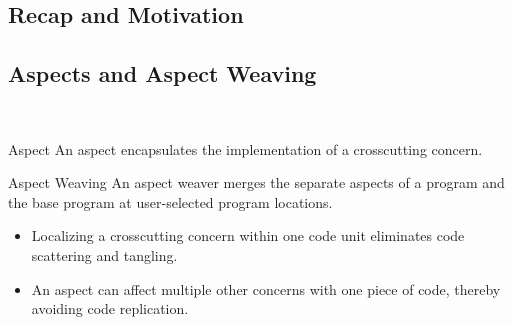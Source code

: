 \subsection{Recap and Motivation}


\subsection{Aspects and Aspect Weaving}

\begin{frame}{\myframetitle\ }
	\begin{mycolumns}[animation=none]
		\begin{definition}{Aspect }
			An aspect encapsulates the implementation of a crosscutting concern.
		\end{definition}
		\begin{definition}{Aspect Weaving }
			An aspect weaver merges the separate aspects of a program and the base program at user-selected program locations.
		\end{definition}
		\begin{note}{}
			\begin{itemize}
				\item Localizing a crosscutting concern within one code unit eliminates code scattering and tangling.
				\item An aspect can affect multiple other concerns with one piece of code, thereby avoiding code replication.
			\end{itemize}
		\end{note}
	\mynextcolumn
		\begin{exampletight}{}
			\centering
		\end{exampletight}
	\end{mycolumns}
\end{frame}

